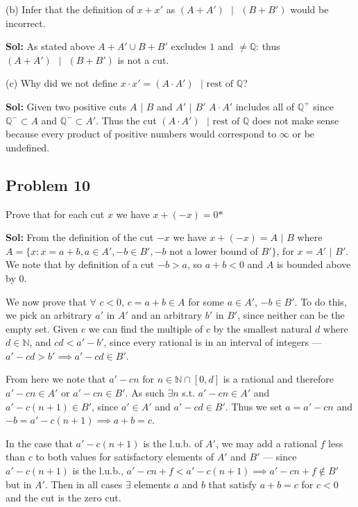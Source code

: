 \documentclass{amsart}
\begin{document}
\bigskip

\indent (b) Infer that the definition of $x + x'$ as $(A + A')\text{ }| \text{ }(B + B')$ would be incorrect.

\medskip
\noindent \textbf{Sol:} As stated above $A+A'\cup B+B'$ excludes $1$ and $\neq \mathbb{Q}$: thus $(A + A')\text{ }| \text{ }(B + B')$
is not a cut.

\bigskip

\indent (c) Why did we not define $x\cdot x' =(A\cdot A')\text{ } |\text{ rest of }\mathbb{Q}$?

\medskip
\noindent \textbf{Sol:} Given two positive cuts $A$ $|$ $B$ and $A'$ $|$ $B'$ $A\cdot A'$ includes all of $\mathbb{Q}^+$ since $\mathbb{Q}^- \subset A$
and $\mathbb{Q}^- \subset A'$. Thus the cut $(A\cdot A')\text{ } |\text{ rest of }\mathbb{Q}$ does not make sense because every product of positive
numbers would correspond to $\infty$ or be undefined.




\newpage
\subsection*{Problem 10}
\noindent Prove that for each cut $x$ we have $x + (-x) = 0\text{*}$

\medskip
\noindent \textbf{Sol:} From the definition of the cut $-x$ we have $x + (-x) = A$ $|$ $B$ where $A = \{x : x = a+b, a\in A', -b \in B', -b$ 
not a lower bound of $B'\}$, for $x = A'$ $|$ $B'$. We note that by definition of a cut $-b > a$, so $a+b<0$ and $A$ is bounded above by $0$.

\medskip
\noindent We now prove that $\forall$ $c<0$, $c = a+b \in A$ for some $a\in A'$, $-b\in B'$. 
To do this, we pick an arbitrary $a'$ in $A'$ and an arbitrary $b'$ in $B'$, since neither can be the empty set. Given $c$ we can find the 
multiple of $c$ by the smallest natural $d$ where $d\in\mathbb{N}$, and $cd < a'-b'$, since every rational is in an interval of integers — 
$a'-cd>b'\implies a'-cd\in B'$. 

\medskip
\noindent From here we note that $a' - cn$ for $n\in \mathbb{N} \cap [0, d]$ is a rational and therefore $a'-cn\in A'$ or 
$a'-cn\in B'$. As such $\exists n$ s.t. $a'-cn\in A'$ and $a'-c(n+1)\in B'$, since $a'\in A'$ and $a'-cd\in B'$. Thus we set $a=a'-cn$ and 
$-b=a'-c(n+1)\implies a+b=c$. 

\medskip
\noindent In the case that $a'-c(n+1)$ is the l.u.b. of $A'$, we may add a rational $f$ less than $c$ to both values for satisfactory
elements of $A'$ and $B'$ — since $a'-c(n+1)$ is the l.u.b., $a'-cn +f<a'-c(n+1)\implies a'-cn+f\notin B'$ but in $A'$. Then in all cases $\exists$ 
elements $a$ and $b$ that satisfy $a+b=c$ for $c<0$ and the cut is the zero cut. 
\end{document}
